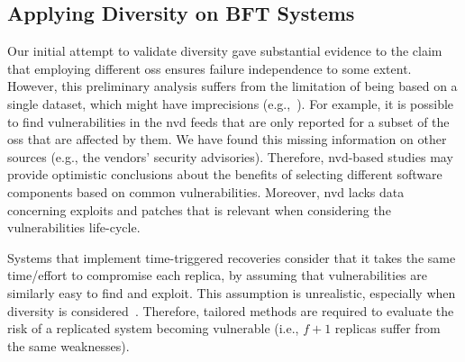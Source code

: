 \subsection{Applying Diversity on BFT Systems}

Our initial attempt to validate diversity gave substantial evidence to the claim that employing different \glspl{os} ensures failure independence to some extent.
However, this preliminary analysis suffers from the limitation of being based on a single dataset, which might have imprecisions (e.g.,~\cite{Han:2009,Frei:2010,Shahzad:2012,Bozorgi:2010,Allodi:2014,Gorbenko:2017}).
For example, it is possible to find vulnerabilities in the \gls{nvd} feeds that are only reported for a subset of the \glspl{os} that are affected by them.
We have found this missing information on other sources (e.g., the vendors' security advisories).
Therefore, \gls{nvd}-based studies may provide optimistic conclusions about the benefits of selecting different software components based on common vulnerabilities.
Moreover, \gls{nvd} lacks data concerning exploits and patches that is relevant when considering the vulnerabilities life-cycle.


Systems that implement time-triggered recoveries consider that it takes the same time/effort to compromise each replica, by assuming that vulnerabilities are similarly easy to find and exploit. 
This assumption is unrealistic, especially when diversity is considered~\cite{Nayak:2014}. 
Therefore, tailored methods are required to evaluate the risk of a replicated system becoming vulnerable (i.e., $f+1$ replicas suffer from the same weaknesses).


